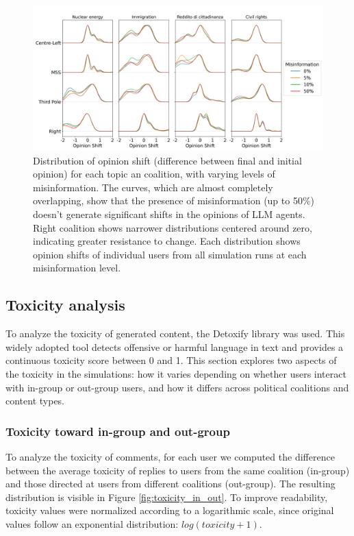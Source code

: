 \begin{figure}[h]
    \centering
    \includegraphics[width=0.8\linewidth]{Images/Misinformation/score_llm_RandomRecSys.png}
    \caption{Distribution of opinion shift (difference between final and initial opinion) for each topic an coalition, with varying levels of misinformation.
    The curves, which are almost completely overlapping, show that the presence of misinformation (up to 50\%) doesn't generate significant shifts in the opinions of LLM agents.
    Right coalition shows narrower distributions centered around zero, indicating greater resistance to change.
    Each distribution shows opinion shifts of individual users from all simulation runs at each misinformation level.}
    \label{fig:misinfo_opinion_shift}
\end{figure}


\subsection{Toxicity analysis}
To analyze the toxicity of generated content, the Detoxify library \cite{hanu2020detoxify} was used. This widely adopted tool detects offensive or harmful language in text and provides a continuous toxicity score between 0 and 1.
This section explores two aspects of the toxicity in the simulations: how it varies depending on whether users interact with in-group or out-group users, and how it differs across political coalitions and content types.

\subsubsection{Toxicity toward in-group and out-group
}
To analyze the toxicity of comments, for each user we computed the difference between the average toxicity of replies to users from the same coalition (in-group) and those directed at users from different coalitions (out-group).
The resulting distribution is visible in Figure \ref{fig:toxicity_in_out}.
To improve readability, toxicity values were normalized according to a logarithmic scale, since original values follow an exponential distribution: $log(toxicity + 1)$.

